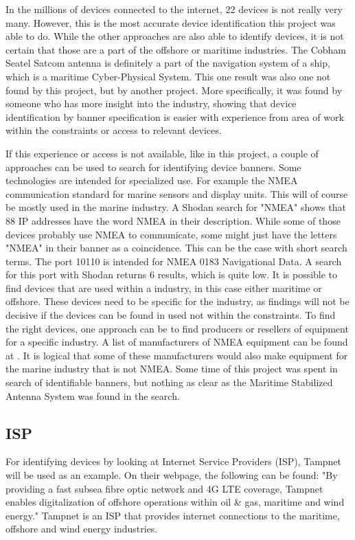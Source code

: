 In the millions of devices connected to the internet, 22 devices is not really very many. However, this is the most accurate device identification this project was able to do. While the other approaches are also able to identify devices, it is not certain that those are a part of the offshore or maritime industries. The Cobham Seatel Satcom antenna is definitely a part of the navigation system of a ship, which is a maritime Cyber-Physical System. This one result was also one not found by this project, but by another project. More specifically, it was found by someone who has more insight into the industry, showing that device identification by banner specification is easier with experience from area of work within the constraints or access to relevant devices.

If this experience or access is not available, like in this project, a couple of approaches can be used to search for identifying device banners. 
Some technologies are intended for specialized use. For example the NMEA communication standard for marine sensors and display units. \cite{NMEA} This will of course be mostly used in the marine industry. A Shodan search for "NMEA" shows that 88 IP addresses have the word NMEA in their description. While some of those devices probably use NMEA to communicate, some might just have the letters "NMEA" in their banner as a coincidence. This can be the case with short search terms. The port 10110 is intended for NMEA 0183 Navigational Data. \cite{www_ports} A search for this port with Shodan returns 6 results, which is quite low. 
It is possible to find devices that are used within a industry, in this case either maritime or offshore. These devices need to be specific for the industry, as findings will not be decisive if the devices can be found in used not within the constraints. To find the right devices, one approach can be to find producers or resellers of equipment for a specific industry. A list of manufacturers of NMEA equipment can be found at \cite{NMEA}. It is logical that some of these manufacturers would also make equipment for the marine industry that is not NMEA. 
Some time of this project was spent in search of identifiable banners, but nothing as clear as the Maritime Stabilized Antenna System was found in the search. 


\subsection{ISP}
For identifying devices by looking at Internet Service Providers (ISP), Tampnet will be used as an example. On their webpage, the following can be found: "By providing a fast subsea fibre optic network and 4G LTE coverage, Tampnet enables digitalization of offshore operations within oil \& gas, maritime and wind energy." \cite{tampnet} Tampnet is an ISP that provides internet connections to the maritime, offshore and wind energy industries. 


